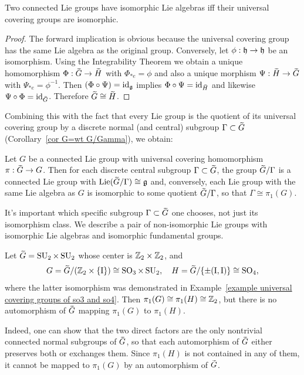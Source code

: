 \begin{thm}[{{\cite[Thm.~9.5.13]{HN}}}]
    Two connected Lie groups have isomorphic Lie algebras iff their universal covering groups are isomorphic.
\end{thm}
\begin{proof}
    The forward implication is obvious because the universal covering group has the same Lie algebra as the original group. Conversely, let $\phi:\mathfrak{h}\to \mathfrak{h}$ be an isomorphism. Using the Integrability Theorem we obtain a unique homomorphism $\Phi:\wt{G}\to \wt{H}$ with $\Phi_{\ast e}=\phi$ and also a unique morphism $\Psi:\wt{H}\to \wt{G}$ with $\Psi_{\ast e}=\phi^{-1}$. Then $(\Phi\circ\Psi)=\operatorname{id}_{\mathfrak{g}}$ implies  $\Phi\circ\Psi=\id_{\wt H}$ and likewise $\Psi\circ\Phi=\id_{\wt G}$. Therefore $\wt{G}\cong \wt{H}$.
\end{proof}
Combining this with the fact that every Lie group is the quotient of its universal covering group by a discrete normal (and central) subgroup $\Gamma\subset \wt{G}$ (Corollary~\ref{cor G=wt G/Gamma}), we obtain:

\begin{cor}
    Let $G$ be a connected Lie group with universal covering homomorphism $\pi:\wt{G}\to G$. Then for each discrete central subgroup $\Gamma\subset \wt G$, the group $\wt{G}\slash\Gamma$ is a connected Lie group with $\Lief (\wt{G}\slash \Gamma)\cong \frakg$  and, conversely, each Lie group with the same Lie algebra as $G$ is isomorphic to some quotient $\wt{G}\slash \Gamma$, so that $\Gamma\cong \pi_1(G)$.
\end{cor}

\begin{example}
    It's important which specific subgroup $\Gamma\subset \wt{G}$ one chooses, not just its isomorphism class.
    We describe a pair of non-isomorphic Lie groups with isomorphic Lie algebras and isomorphic fundamental groups.

    Let $\wt{G}=\SU_2\times \SU_2$ whose center is $\mathbb{Z}_2\times\mathbb{Z}_2$, and 
    \[G=\wt{G}\slash (\bbZ_2\times \{\rmI\})\cong \SO_3\times \SU_2,\quad H=\wt{G}\slash \{\pm (\rmI,\rmI)\}\cong \SO_4,\]
    where the latter isomorphism was demonstrated in Example~\ref{example universal covering groups of so3 and so4}. Then $\pi_1(G)\cong \pi_1(H)\cong \mathbb{Z}_2$, but there is no automorphism of $\wt{G}$ mapping $\pi_1(G)$ to $\pi_1(H)$.

    Indeed, one can show that the two direct factors are the only nontrivial connected normal subgroups of $\wt{G}$, so that each automorphism of $\wt{G}$ either preserves both or exchanges them. Since $\pi_1(H)$ is not contained in any of them, it cannot be mapped to $\pi_1(G)$ by an automorphism of $\wt G$.
\end{example}

